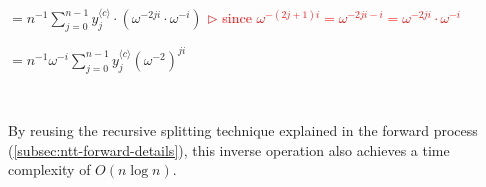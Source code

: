 $ = n^{-1} \sum\limits_{j=0}^{n-1} y_j^{\langle c \rangle} \cdot (\omega^{-2ji} \cdot \omega^{-i}) $ \textcolor{red}{ $\rhd$ since $\omega^{-(2j+1)i} = \omega^{-2ji - i} = \omega^{-2ji} \cdot \omega^{-i}$}

$= n^{-1} \omega^{-i} \sum\limits_{j=0}^{n-1} {y}_j^{\langle c \rangle} (\omega^{-2})^{ji}$

$ $


By reusing the recursive splitting technique explained in the forward process (\autoref{subsec:ntt-forward-details}), this inverse operation also achieves a time complexity of $O(n \log n)$.

